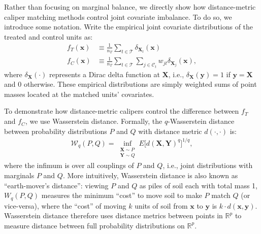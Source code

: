 \documentclass{article}
\newcommand{\bX}{\mathbf{X}}
\newcommand{\Xt}{\mathbf{X}_t}
\newcommand{\Xj}{\mathbf{X}_j}
\newcommand{\Rp}{\mathbb{R}^p}
\newcommand{\Ct}{\mathcal{C}_{t}}
\newcommand{\ind}[1]{\mathds{1} \{ #1 \} }
\begin{document}
Rather than focusing on marginal balance, we directly show how distance-metric caliper matching methods control joint covariate imbalance.
To do so, we introduce some notation.
Write the empirical joint covariate distributions of the treated and control units as:
\begin{align*}
    f_T(\mathbf{x}) 
    &\equiv \frac{1}{n_T} \sum_{t \in \mathcal{T}} \delta_{\Xt}(\mathbf{x}) \\
    f_C(\mathbf{x}) 
    &\equiv \frac{1}{n_T} \sum_{t \in \mathcal{T}} \sum_{j \in \Ct} w_{jt} \delta_{\Xj} (\mathbf{x}),
\end{align*}
where $\delta_{\bX}(\cdot)$ represents a Dirac delta function at $\bX$, i.e., $\delta_{\bX}(\mathbf{y}) = 1$ if $\mathbf{y} = \mathbf{X}$ and $0$ otherwise.
These empirical distributions are simply weighted sums of point masses located at the matched units' covariates.

To demonstrate how distance-metric calipers control the difference between $f_T$ and $f_C$, we use Wasserstein distance.
Formally, the $q$-Wasserstein distance between probability distributions $P$ and $Q$ with distance metric $d(\cdot, \cdot)$ is:
\begin{align*}
    \mathcal{W}_q(P, Q) = \inf_{\substack{\bX \sim P \\ \mathbf{Y} \sim Q}} E\big[ d(\bX, \mathbf{Y})^q \big]^{1/q},
\end{align*}
where the infimum is over all couplings of $P$ and $Q$, i.e., joint distributions with marginals $P$ and $Q$.
More intuitively, Wasserstein distance is also known as ``earth-mover's distance'':
viewing $P$ and $Q$ as piles of soil each with total mass 1, $W_q(P, Q)$ measures the minimum ``cost'' to move soil to make $P$ match $Q$ (or vice-versa), where the ``cost'' of moving $k$ units of soil from $\mathbf{x}$ to $\mathbf{y}$ is $k \cdot d(\mathbf{x}, \mathbf{y})$.
Wasserstein distance therefore uses distance metrics between points in $\Rp$ to measure distance between full probability distributions on $\Rp$.
\end{document}
